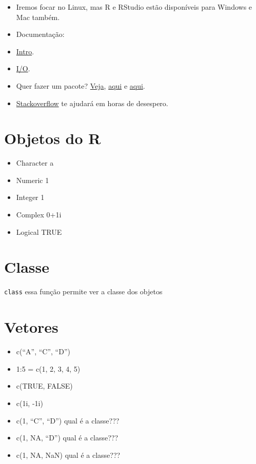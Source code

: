 \documentclass[]{book}
\providecommand{\tightlist}{%
  \setlength{\itemsep}{0pt}\setlength{\parskip}{0pt}}
\begin{document}
\begin{itemize}
\tightlist
\item
  Iremos focar no Linux, mas R e RStudio estão disponíveis para Windows
  e Mac também.
\item
  Documentação:
\item
  \href{http://cran.r-project.org/doc/manuals/r-release/R-intro.html}{Intro}.
\item
  \href{http://cran.r-project.org/doc/manuals/r-release/R-data.html}{I/O}.
\item
  Quer fazer um pacote?
  \href{http://cran.r-project.org/doc/manuals/r-release/R-exts.html}{Veja},
  \href{http://cran.r-project.org/doc/manuals/r-release/R-ints.html}{aqui}
  e
  \href{http://cran.r-project.org/doc/manuals/r-release/R-lang.html}{aqui}.
\item
  \href{https://stackoverflow.com/questions/tagged/r}{Stackoverflow} te
  ajudará em horas de desespero.
\end{itemize}

\section{Objetos do R}\label{objetos-do-r}

\begin{itemize}
\tightlist
\item
  Character a
\item
  Numeric 1
\item
  Integer 1
\item
  Complex 0+1i
\item
  Logical TRUE
\end{itemize}

\section{Classe}\label{classe}

\texttt{class} essa função permite ver a classe dos objetos

\section{Vetores}\label{vetores}

\begin{itemize}
\tightlist
\item
  c(``A'', ``C'', ``D'')
\item
  1:5 = c(1, 2, 3, 4, 5)
\item
  c(TRUE, FALSE)
\item
  c(1i, -1i)
\item
  c(1, ``C'', ``D'') qual é a classe???
\item
  c(1, NA, ``D'') qual é a classe???
\item
  c(1, NA, NaN) qual é a classe???
\end{itemize}
\end{document}
